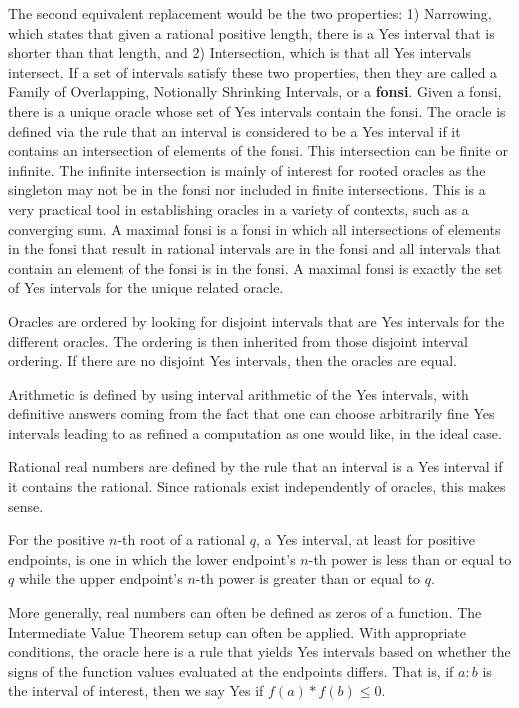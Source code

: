 \documentclass[12pt]{article}
\begin{document}
The second equivalent replacement would be the two properties: 1) Narrowing, which states that given a rational positive length, there is a Yes interval that is shorter than that length, and 2) Intersection, which is that all Yes intervals intersect. If a set of intervals satisfy these two properties, then they are called a Family of Overlapping, Notionally Shrinking Intervals, or a \textbf{fonsi}. Given a fonsi, there is a unique oracle whose set of Yes intervals contain the fonsi. The oracle is defined via the rule that an interval is considered to be a Yes interval if it contains an intersection of elements of the fonsi. This intersection can be finite or infinite. The infinite intersection is mainly of interest for rooted oracles as the singleton may not be in the fonsi nor included in finite intersections. This is a very practical tool in establishing oracles in a variety of contexts, such as a converging sum. A maximal fonsi is a fonsi in which all intersections of elements in the fonsi that result in rational intervals are in the fonsi and all intervals that contain an element of the fonsi is in the fonsi. A maximal fonsi is exactly the set of Yes intervals for the unique related oracle. 

Oracles are ordered by looking for disjoint intervals that are Yes intervals for the different oracles. The ordering is then inherited from those disjoint interval ordering. If there are no disjoint Yes intervals, then the oracles are equal. 

Arithmetic is defined by using interval arithmetic of the Yes intervals, with definitive answers coming from the fact that one can choose arbitrarily fine Yes intervals leading to as refined a computation as one would like, in the ideal case.  

Rational real numbers are defined by the rule that an interval is a Yes interval if it contains the rational. Since rationals exist independently of oracles, this makes sense. 

For the positive $n$-th root of a rational $q$, a Yes interval, at least for positive endpoints, is one in which the lower endpoint's $n$-th power is less than or equal to $q$ while the upper endpoint's $n$-th power is greater than or equal to $q$.

More generally, real numbers can often be defined as zeros of a function. The Intermediate Value Theorem setup can often be applied. With appropriate conditions, the oracle here is a rule that yields Yes intervals based on whether the signs of the function values evaluated at the endpoints differs. That is, if $a:b$ is the interval of interest, then we say Yes if $f(a)*f(b) \leq 0$.
\end{document}
